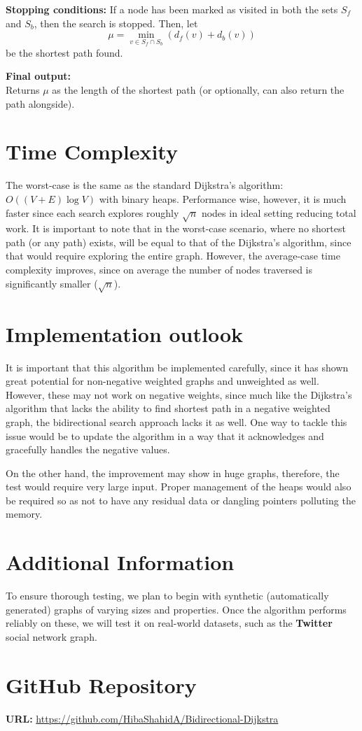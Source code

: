 \documentclass[12pt]{article}
\begin{document}
\textbf{Stopping conditions:}
If a node has been marked as visited in both the sets \( S_f \) and \( S_b \), then the search is stopped. Then, let 
\[
\mu = \min_{v \in S_f \cap S_b}(d_f(v) + d_b(v))
\]
be the shortest path found.

\textbf{Final output:} \\
Returns \( \mu \) as the length of the shortest path (or optionally, can also return the path alongside).

\section*{Time Complexity}
The worst-case is the same as the standard Dijkstra's algorithm: \( O((V+E)\log V) \) with binary heaps. Performance wise, however, it is much faster since each search explores roughly \( \sqrt{n} \) nodes in ideal setting reducing total work. It is important to note that in the worst-case scenario, where no shortest path (or any path) exists, will be equal to that of the Dijkstra's algorithm, since that would require exploring the entire graph. However, the average-case time complexity improves, since on average the number of nodes traversed is significantly smaller (\( \sqrt{n} \)).

\section*{Implementation outlook}
It is important that this algorithm be implemented carefully, since it has shown great potential for non-negative weighted graphs and unweighted as well. However, these may not work on negative weights, since much like the Dijkstra's algorithm that lacks the ability to find shortest path in a negative weighted graph, the bidirectional search approach lacks it as well. One way to tackle this issue would be to update the algorithm in a way that it acknowledges and gracefully handles the negative values. 

On the other hand, the improvement may show in huge graphs, therefore, the test would require very large input. Proper management of the heaps would also be required so as not to have any residual data or dangling pointers polluting the memory.

\section*{Additional Information}
To ensure thorough testing, we plan to begin with synthetic (automatically generated) graphs of varying sizes and properties. Once the algorithm performs reliably on these, we will test it on real-world datasets, such as the \textbf{Twitter} social network graph.

\section*{GitHub Repository}
\textbf{URL:} \url{https://github.com/HibaShahidA/Bidirectional-Dijkstra}\\
\end{document}
